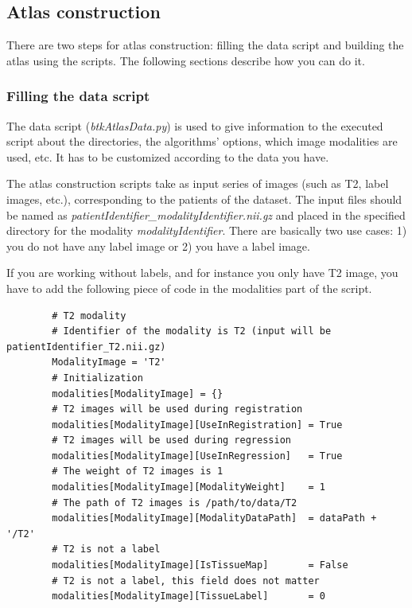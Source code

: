 \subsection{Atlas construction \cite{pontabry_2012_longitudinal}}
\label{subsec:atlas}

    There are two steps for atlas construction: filling the data script and building the atlas using the scripts. The following sections describe how you can do it.

    \subsubsection*{Filling the data script}
    
    The data script (\emph{btkAtlasData.py}) is used to give information to the executed script about the directories, the algorithms' options, which image modalities are used, etc. It has to be customized according to the data you have.
    
    The atlas construction scripts take as input series of images (such as T2, label images, etc.), corresponding to the patients of the dataset. The input files should be named as \emph{patientIdentifier\_modalityIden\-tifier.nii.gz} and placed in the specified directory for the modality \emph{modalityIdentifier}. There are basically two use cases: 1) you do not have any label image or 2) you have a label image.

    If you are working without labels, and for instance you only have T2 image, you have to add the following piece of code in the modalities part of the script.
    \begin{verbatim}
        # T2 modality
        # Identifier of the modality is T2 (input will be patientIdentifier_T2.nii.gz)
        ModalityImage = 'T2'
        # Initialization
        modalities[ModalityImage] = {}
        # T2 images will be used during registration
        modalities[ModalityImage][UseInRegistration] = True
        # T2 images will be used during regression
        modalities[ModalityImage][UseInRegression]   = True
        # The weight of T2 images is 1
        modalities[ModalityImage][ModalityWeight]    = 1
        # The path of T2 images is /path/to/data/T2
        modalities[ModalityImage][ModalityDataPath]  = dataPath + '/T2'
        # T2 is not a label
        modalities[ModalityImage][IsTissueMap]       = False
        # T2 is not a label, this field does not matter
        modalities[ModalityImage][TissueLabel]       = 0
    \end{verbatim}

